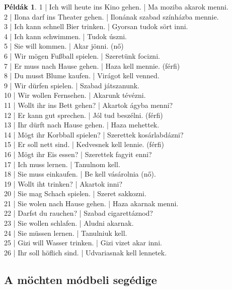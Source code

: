 \documentclass{article}
\theoremstyle{definition}
\newtheorem*{exmp}{Példák}
\begin{document}
\begin{exmp}
1 | Ich will heute ins Kino gehen. | Ma moziba akarok menni.\\
2 | Ilona darf ins Theater gehen. | Ilonának szabad színházba mennie.\\
3 | Ich kann schnell Bier trinken. | Gyorsan tudok sört inni.\\
4 | Ich kann schwimmen. | Tudok úszni.\\
5 | Sie will kommen. | Akar jönni. (nő)\\
6 | Wir mögen Fußball spielen. | Szeretünk focizni.\\
7 | Er muss nach Hause gehen. | Haza kell mennie. (férfi)\\
8 | Du musst Blume kaufen. | Virágot kell venned.\\
9 | Wir dürfen spielen. | Szabad játszanunk.\\
10 | Wir wollen Fernsehen. | Akarunk tévézni.\\
11 | Wollt ihr ins Bett gehen? | Akartok ágyba menni?\\
12 | Er kann gut sprechen. | Jól tud beszélni. (férfi)\\
13 | Ihr dürft nach Hause gehen. | Haza mehettek.\\
14 | Mögt ihr Korbball spielen? | Szerettek kosárlabdázni?\\
15 | Er soll nett sind. | Kedvesnek kell lennie. (férfi)\\
16 | Mögt ihr Eis essen? | Szerettek fagyit enni?\\
17 | Ich muss lernen. | Tanulnom kell.\\
18 | Sie muss einkaufen. | Be kell vásárolnia (nő).\\
19 | Wollt iht trinken? | Akartok inni?\\
20 | Sie mag Schach spielen. | Szeret sakkozni.\\
21 | Sie wolen nach Hause gehen. | Haza akarnak menni.\\
22 | Darfst du rauchen? | Szabad cigarettáznod?\\
23 | Sie wollen schlafen. | Aludni akarnak.\\
24 | Sie müssen lernen. | Tanulniuk kell.\\
25 | Gizi will Wasser trinken. | Gizi vizet akar inni.\\
26 | Ihr soll höflich sind. | Udvariasnak kell lennetek.\\
\end{exmp}

\subsection{A möchten módbeli segédige}
\end{document}
